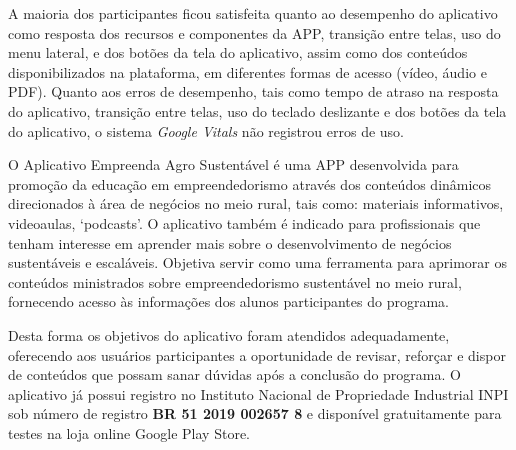 A maioria dos participantes ficou satisfeita quanto ao desempenho do aplicativo como resposta dos recursos e componentes da APP, transição entre telas, uso do menu lateral, e dos botões da tela do aplicativo, assim como dos conteúdos disponibilizados na plataforma, em diferentes formas de acesso (vídeo, áudio e PDF).
Quanto aos erros de desempenho, tais como tempo de atraso na resposta do aplicativo, transição entre telas, uso do teclado deslizante e dos botões da tela do aplicativo, o sistema \textit{Google Vitals} não registrou erros de uso.

O Aplicativo Empreenda Agro Sustentável é uma APP desenvolvida para promoção da educação em empreendedorismo através dos conteúdos dinâmicos direcionados à área de negócios no meio rural, tais como: materiais informativos, videoaulas, ‘podcasts’. O aplicativo também é indicado para profissionais que tenham interesse em aprender mais sobre o desenvolvimento de negócios sustentáveis e escaláveis. Objetiva servir como uma ferramenta para aprimorar os conteúdos ministrados sobre empreendedorismo sustentável no meio rural, fornecendo acesso às informações dos alunos participantes do programa. 

Desta forma os objetivos do aplicativo foram atendidos adequadamente, oferecendo aos usuários participantes a oportunidade de revisar, reforçar e dispor de conteúdos que possam sanar dúvidas após a conclusão do programa. O aplicativo já possui registro no Instituto Nacional de Propriedade Industrial INPI sob número de registro \textbf{BR 51 2019 002657 8} e disponível gratuitamente para testes na loja online Google Play Store.

